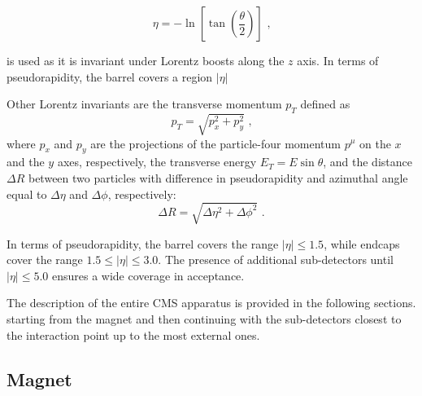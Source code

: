 \begin{equation}
\eta=-\ln\left [\tan\left(\frac{\theta}{2}\right)\right]\mbox{ ,}
\end{equation}

is used as it is invariant under Lorentz boosts along the $z$ axis.
In terms of pseudorapidity, the barrel covers a region $|\eta|$

Other Lorentz invariants are the transverse momentum $p_T$ defined as
\begin{equation}
p_T=\sqrt{p^2_x+p^2_y}\mbox{ ,}
\end{equation}
where $p_x$ and $p_y$ are the projections of the particle-four momentum $p^\mu$ on the $x$ and the $y$ axes, 
respectively, the transverse energy $E_T=E\sin\theta$, and the distance $\Delta R$ between two particles with difference in 
pseudorapidity and azimuthal angle equal to $\Delta\eta$ and $\Delta\phi$, respectively:
\begin{equation}
\Delta R=\sqrt{ \Delta\eta^2 + \Delta\phi^2 }\mbox{ .}
\end{equation}

In terms of pseudorapidity, the barrel covers the range $|\eta|\le1.5$, 
while endcaps cover the range $1.5\le|\eta|\le3.0$. The presence of
additional sub-detectors until $|\eta|\le5.0$ ensures a wide coverage in acceptance.  

The description of the entire CMS apparatus is provided in the following sections.
starting from the magnet and then continuing with the sub-detectors closest to the
 interaction point up to the most external ones.
 
\subsection{Magnet}
\label{subsec:magnet}

